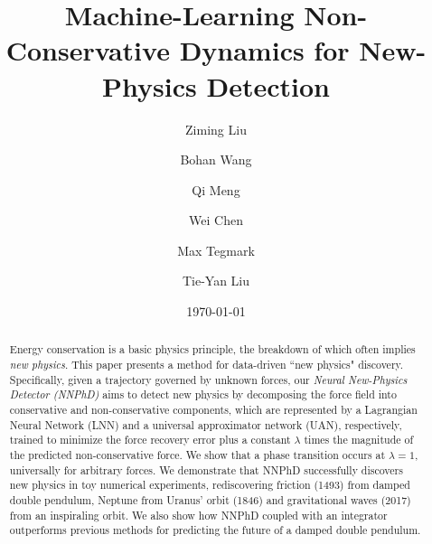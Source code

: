 \documentclass[aps,pre,reprint,superscriptaddress,nofootinbib,amsmath,amssymb]{revtex4-2}
\begin{document}

\title{Machine-Learning Non-Conservative Dynamics for New-Physics Detection}%

\author{Ziming Liu}
\author{Bohan Wang}
\author{Qi Meng}
\author{Wei Chen}
\author{Max Tegmark}
\author{Tie-Yan Liu}

\date{\today}%

\begin{abstract}
	Energy conservation is a basic physics principle, the breakdown of which often implies \textit{new physics}. This paper presents a method for data-driven ``new physics" discovery. Specifically, given a trajectory governed by unknown forces, our \textit{Neural New-Physics Detector (NNPhD)} aims to detect new physics by decomposing the force field into conservative and non-conservative components, which are represented by a Lagrangian Neural Network (LNN) and a universal approximator network (UAN), respectively, trained to minimize the force recovery error plus a constant $\lambda$ times the magnitude of the predicted non-conservative force. We show that a phase transition occurs at $\lambda=1$, universally for arbitrary forces. We demonstrate that NNPhD successfully discovers new physics in toy numerical experiments, rediscovering friction (1493) from damped double pendulum, Neptune from Uranus' orbit (1846) and gravitational waves (2017) from an inspiraling orbit. We also show how NNPhD coupled with an integrator outperforms previous methods for predicting the future of a damped double pendulum.
\end{abstract}


\maketitle
\end{document}
